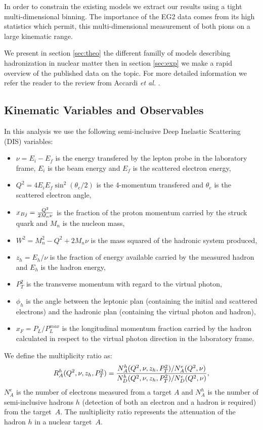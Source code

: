 In order to constrain the existing models we extract our results
using a tight multi-dimensional binning. 
The importance of the EG2 data comes from its high statistics which permit, 
this multi-dimensional measurement of both pions on a 
large kinematic range.

We present in section \ref{sec:theo} the different familly of models describing
hadronization in nuclear matter then in section \ref{sec:exp} we make a rapid
overview of the published data on the topic. For more detailed information we 
refer the reader to the review from Accardi {\it et al.} \cite{Accardi:2009qv}.


\subsection{Kinematic Variables and Observables}

In this analysis we use the following semi-inclusive Deep Inelastic Scattering (DIS) variables:
\begin{itemize}
 \item $\nu = E_i - E_f$ is the energy transfered by the lepton probe in the laboratory frame, $E_i$ is the beam energy and $E_f$ is the scattered electron energy,
 \item $Q^2 = 4 E_i E_f \sin ^2(\theta_e / 2)$ is the 4-momentum transfered and $\theta_e$ is the scattered electron angle,
 \item $x_{Bj} = {{Q^2} \over {2 M_n \nu}}$ is the fraction of the proton momentum carried by the struck quark and $M_n$ is the nucleon mass,
 \item $W^2 = M_n^2 - Q^2 + 2 M_n \nu$ is the mass squared of the hadronic system produced,
 \item $z_h = E_h / \nu$ is the fraction of energy available carried by the measured hadron and $E_h$ is the hadron energy,
 \item $P_T^2$ is the transverse momentum with regard to the virtual photon,
 \item $\phi_h$ is the angle between the leptonic plan (containing the initial and scattered electrons) and the hadronic plan (containing the virtual photon and hadron),
 \item $x_F = P_L/P_L^{max}$ is the longitudinal momentum fraction carried by the hadron calculated in respect to the virtual photon direction in the laboratory frame.
\end{itemize}

We define the multiplicity ratio as:
\begin{equation}
R_A^h (Q^2,\nu,z_h,P_T^2) = {{N_A^h (Q^2,\nu,z_h,P_T^2) / N_A^e (Q^2,\nu)} 
                       \over {N_D^h (Q^2,\nu,z_h,P_T^2) / N_D^e (Q^2,\nu)}},
\end{equation}
$N^e_A$ is the number of electrons measured from a target $A$ and $N_A^h$ is the number
of semi-inclusive hadrons $h$ (detection of both an electron and a hadron is required) from the
target~$A$. The multiplicity ratio represents the attenuation of the hadron $h$ in a 
nuclear target~$A$.
\newline

